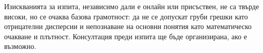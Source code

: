 Изискванията за изпита, независимо дали е онлайн или присъствен, не са твърде
високи, но се очаква базова грамотност: да не се допускат груби грешки като
отрицателни дисперсии и непознаване на основни понятия като математическо
очакване и плътност. Консултация преди изпита ще бъде организирана, ако е
възможно.
